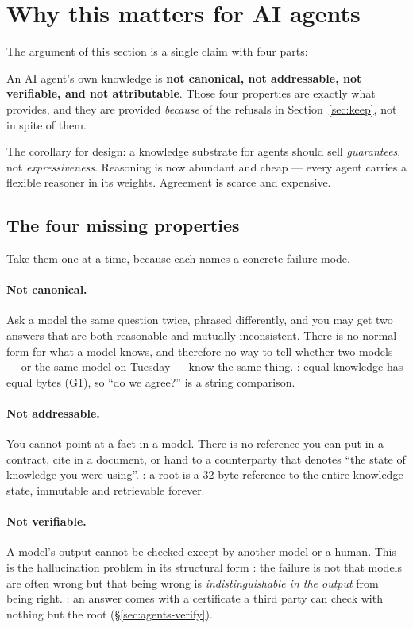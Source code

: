 \section{Why this matters for AI agents}
\label{sec:agents}

The argument of this section is a single claim with four parts:

\begin{keyidea}
An AI agent's own knowledge is \textbf{not canonical, not addressable, not
verifiable, and not attributable}. Those four properties are exactly what
\odag{} provides, and they are provided \emph{because} of the refusals in
Section~\ref{sec:keep}, not in spite of them.

The corollary for design: a knowledge substrate for agents should sell
\emph{guarantees}, not \emph{expressiveness}. Reasoning is now abundant and
cheap --- every agent carries a flexible reasoner in its weights. Agreement is
scarce and expensive.
\end{keyidea}

\subsection{The four missing properties}

Take them one at a time, because each names a concrete failure mode.

\paragraph{Not canonical.} Ask a model the same question twice, phrased
differently, and you may get two answers that are both reasonable and
mutually inconsistent. There is no normal form for what a model knows, and
therefore no way to tell whether two models --- or the same model on Tuesday
--- know the same thing. \odag{}: equal knowledge has equal bytes (G1), so
``do we agree?'' is a string comparison.

\paragraph{Not addressable.} You cannot point at a fact in a model. There is
no reference you can put in a contract, cite in a document, or hand to a
counterparty that denotes ``the state of knowledge you were using''. \odag{}:
a root is a 32-byte reference to the entire knowledge state, immutable and
retrievable forever.

\paragraph{Not verifiable.} A model's output cannot be checked except by
another model or a human. This is the hallucination problem in its structural
form \citep{ji2023}: the failure is not that models are often wrong but that
being wrong is \emph{indistinguishable in the output} from being right.
\odag{}: an answer comes with a certificate a third party can check with
nothing but the root (\S\ref{sec:agents-verify}).

